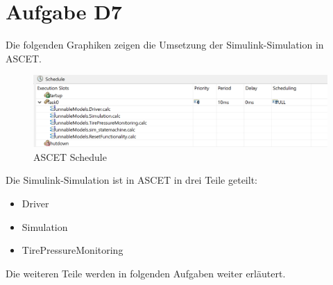 
\chapter{Aufgabe D7}
Die folgenden Graphiken zeigen die Umsetzung der Simulink-Simulation in ASCET. 
\begin{figure}[h!]
	\centering
	\includegraphics[width=1\linewidth]{../Graphiken/Schedule}
	\caption{ASCET Schedule}
	\label{fig:Schedule}
\end{figure}
Die Simulink-Simulation ist in ASCET in drei Teile geteilt:
\begin{itemize}
	\item Driver
	\item Simulation
	\item TirePressureMonitoring
\end{itemize}
Die weiteren Teile werden in folgenden Aufgaben weiter erläutert.
